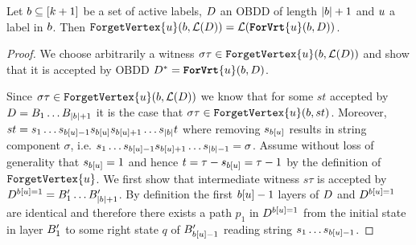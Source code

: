 \begin{lemma}
\label{lemma:SymbolicForgetVertexAppendix}
Let $b \subseteq [k+1]$ be a set of active labels, $D$ an OBDD of length $|b|+1$ and $u$ a label in $b$. Then  $\texttt{ForgetVertex}\{u\}(b, \mathcal{L}(D))  = \mathcal{L}(\texttt{\textbf{ForVrt}}\{u\}(b, D))$.
\end{lemma}

\begin{proof}
    We choose arbitrarily a  witness $\sigma\tau\in \texttt{ForgetVertex}\{u\}(b,\mathcal{L}(D))$ and show that it is accepted by OBDD $D^* = \texttt{\textbf{ForVrt}}\{u\}(b,D)$.

    Since $\sigma\tau \in \texttt{ForgetVertex}\{u\}(b,\mathcal{L}(D))$ we know that for some $st$ accepted by $D = B_1\dots B_{|b|+1}$ it is the case that $\sigma\tau \in \texttt{ForgetVertex}\{u\}(b,st)$. Moreover, $st = s_1\dots s_{b[u]-1}s_{b[u]}s_{b[u]+1}\dots s_{|b|}t$ where removing $s_{b[u]}$ results in string component $\sigma$, i.e. $s_1\dots s_{b[u]-1} s_{b[u]+1}\dots s_{|b|-1} = \sigma$. Assume without loss of generality that $s_{b[u]} = 1$ and hence $t = \tau - s_{b[u]} = \tau - 1$ by the definition of $\texttt{ForgetVertex}\{u\}$. We first show that intermediate witness $s\tau$ is accepted by $D^{b[u]=1} = B_1'\dots B_{|b|+1}'$. By definition the first $b[u] -1$ layers of $D$ and $D^{b[u]=1}$ are identical and therefore there exists a path $p_1$ in $D^{b[u]=1}$ from the initial state in layer $B'_1$ to some right state $q$ of $B_{b[u]-1}'$ reading string $s_1\dots s_{b[u]-1}$. 

\end{proof}
